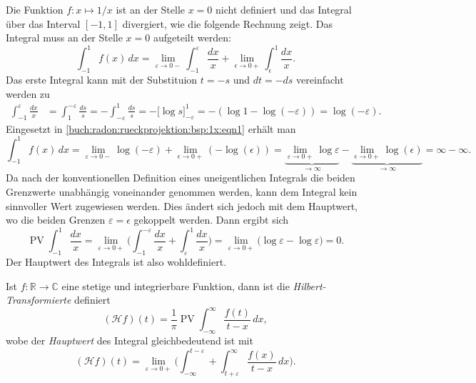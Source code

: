 \begin{beispiel}
Die Funktion $f\colon x\mapsto 1/x$ ist an der Stelle $x=0$ nicht definiert und
das Integral über das Interval $[-1,1]$ divergiert, wie die folgende Rechnung
zeigt.
Das Integral muss an der Stelle $x=0$ aufgeteilt werden:
\begin{equation}
\int_{-1}^1 f(x)\,dx
=
\lim_{\varepsilon\to 0-}
\int_{-1}^{\varepsilon} \frac{dx}{x}
+
\lim_{\epsilon\to 0+}
\int_{\epsilon}^{1} \frac{dx}{x}.
\label{buch:radon:rueckprojektion:bsp:1x:eqn1}
\end{equation}
Das erste Integral kann mit der Substituion $t=-s$ und $dt=-ds$ vereinfacht
werden zu
\begin{align*}
\int_{-1}^{\varepsilon} \frac{dx}{x}
&=
\int_{1}^{-\varepsilon} \frac{ds}{s}
=
-
\int_{-\varepsilon}^1 \frac{ds}{s}
=
-
\biggl[
\log s
\biggr]_{-\varepsilon}^1
=
-
(
\log 1 - \log(-\varepsilon)
)
=
\log(-\varepsilon).
\end{align*}
Eingesetzt in 
\eqref{buch:radon:rueckprojektion:bsp:1x:eqn1}
erhält man
\[
\int_{-1}^1 f(x)\,dx
=
\lim_{\varepsilon\to 0-}
\log(-\varepsilon)
+
\lim_{\epsilon\to 0+}
(-\log(\epsilon))
=
\underbrace{
\lim_{\varepsilon\to 0+}
\log\varepsilon
}_{\displaystyle\to \infty}
-
\underbrace{
\lim_{\epsilon\to 0+}
\log(\epsilon)
}_{\displaystyle\to \infty}
=
\infty - \infty.
\]
Da nach der konventionellen Definition eines uneigentlichen
Integrals die beiden Grenzwerte unabhängig voneinander genommen werden,
kann dem Integral kein sinnvoller Wert zugewiesen werden.
Dies ändert sich jedoch mit dem Hauptwert, wo die beiden Grenzen
$\varepsilon=\epsilon$ gekoppelt werden.
Dann ergibt sich
\[
\operatorname{PV}
\int_{-1}^1 \frac{dx}{x}
=
\lim_{\varepsilon\to 0+}
\biggl(
\int_{-1}^{-\varepsilon}\frac{dx}{x}
+
\int_{\varepsilon}^{1} \frac{dx}{x}
\biggr)
=
\lim_{\varepsilon\to 0+}
\biggl(
\log\varepsilon - \log\varepsilon
\biggr)
=
0.
\]
Der Hauptwert des Integrals ist also wohldefiniert.
\end{beispiel}

\begin{definition}
Ist $f\colon \mathbb{R}\to\mathbb{C}$ eine stetige und integrierbare
Funktion, dann ist die {\em Hilbert-Transformierte} definiert
\[
(\mathscr{H}f)(t)
=
\frac{1}{\pi} \operatorname{PV} \int_{-\infty}^\infty \frac{f(t)}{t-x}\,dx,
\]
wobe der {\em Hauptwert} des Integral gleichbedeutend ist mit
\[
(\mathscr{H}f)(t)
=
\lim_{\varepsilon\to 0+}
\biggl(
\int_{-\infty}^{t-\varepsilon}+\int_{t+\varepsilon}^\infty
\frac{f(x)}{t-x}\,dx
\biggr).
\]
\end{definition}

